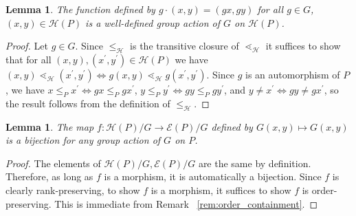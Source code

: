 \documentclass[10 pt]{amsart}
\theoremstyle{plain}
\newtheorem{lem}[thm]{Lemma}
\theoremstyle{definition}
\theoremstyle{remark}
\numberwithin{equation}{section}
\renewcommand{\iff}{\Leftrightarrow}
\begin{document}
\begin{lem}
\label{lem:G_action_on_HP}
The function defined by $g\cdot (x, y)= (gx, gy)$ for all $g\in G$, $(x, y)\in \mathcal{H}(P)$ is a well-defined group action of $G$ on $\mathcal{H}(P)$.
\end{lem}

\begin{proof}
Let $g\in G$.  Since $\le_{\mathcal{H}}$ is the transitive closure of $\lessdot_{\mathcal{H}}$ it suffices to show that for all $(x,y),(x^\prime,y^\prime)\in \mathcal{H}(P)$ we have $(x, y) \lessdot_{\mathcal H} (x^\prime,y^\prime) \iff g(x, y) \lessdot_{\mathcal H} g(x^\prime, y^\prime)$.  Since $g$ is an automorphism of $P$, we have $x\le_P x^\prime \iff gx\le_P gx^\prime$, $y\le_P y^\prime \iff gy\le_P gy^\prime$, and $y\neq x^\prime \iff gy\neq gx^\prime$, so the result follows from the definition of $\le_{\mathcal{H}}$.
\end{proof}







\begin{lem}
\label{lem:bijection_h_f}
The map $f:\mathcal H(P)/G \rightarrow \mathcal E(P)/G$ defined by $G(x,y) \mapsto G(x,y)$ is a bijection for any group action of $G$ on $P$.
\end{lem}

\begin{proof}
The elements of $\mathcal H(P)/G,\mathcal E(P)/G$ are the same by definition. Therefore, as long as $f$ is a morphism, it is automatically a bijection. Since $f$ is clearly rank-preserving, to show $f$ is a morphism, it suffices to show $f$ is order-preserving. This is immediate from Remark ~\ref{rem:order_containment}.
\end{proof}
\end{document}
